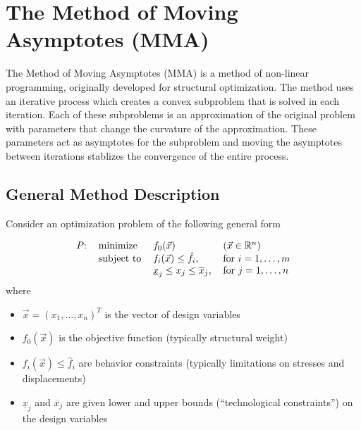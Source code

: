\section{The Method of Moving Asymptotes (MMA)}

The Method of Moving Asymptotes (MMA) is a method of non-linear programming, originally developed for structural optimization. The method uses an iterative process which creates a convex subproblem that is solved in each iteration. Each of these subproblems is an approximation of the original problem with parameters that change the curvature of the approximation. These parameters act as asymptotes for the subproblem and moving the asymptotes between iterations stablizes the convergence of the entire process.

\subsection{General Method Description}
Consider an optimization problem of the following general form

{\color{baystate}
	\begin{equation}
		\begin{tabular}{llll}
			$P$: & minimize & $f_0(\vec{x})$ & $\left(\vec{x}\in\mathbb{R}^n\right)$ \\
			& subject to & $f_i(\vec{x})\leq\hat{f}_i$, & for $i=1,\ldots,m$ \\
			&  & $\underline{x}_j\leq x_j\leq \overline{x}_j$, & for $j=1,\ldots,n$
		\end{tabular}
	\end{equation}
}
where
\begin{itemize}
	\item $\vec{x}=\left(x_1,\ldots,x_n\right)^T$ is the vector of {\color{tiananmen}design variables}
	\item $f_0(\vec{x})$ is the {\color{tiananmen}objective function} (typically structural weight)
	\item $f_i(\vec{x})\leq\hat{f}_i$ are {\color{tiananmen}behavior constraints} (typically limitations on stresses and displacements)
	\item $\underline{x}_j$ and $\overline{x}_j$ are given {\color{tiananmen}lower and upper bounds} (``technological constraints'') {\color{tiananmen}on the design variables}
\end{itemize}

